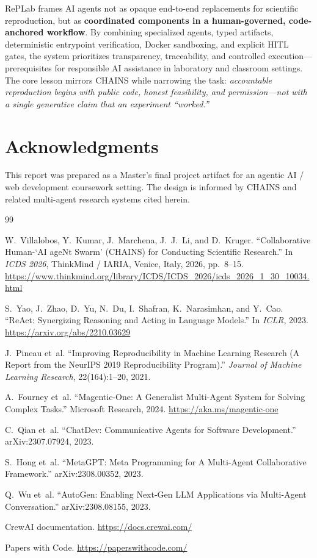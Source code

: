 \documentclass[11pt,a4paper]{article}
\begin{document}
RePLab frames AI agents not as opaque end-to-end replacements for scientific
reproduction, but as \textbf{coordinated components in a human-governed,
code-anchored workflow}. By combining specialized agents, typed artifacts,
deterministic entrypoint verification, Docker sandboxing, and explicit HITL
gates, the system prioritizes transparency, traceability, and controlled
execution---prerequisites for responsible AI assistance in laboratory and
classroom settings. The core lesson mirrors CHAINS while narrowing the task:
\emph{accountable reproduction begins with public code, honest feasibility, and
permission---not with a single generative claim that an experiment ``worked.''}

\section*{Acknowledgments}
This report was prepared as a Master's final project artifact for an agentic AI /
web development coursework setting. The design is informed by CHAINS and related
multi-agent research systems cited herein.

\begin{thebibliography}{99}

W.~Villalobos, Y.~Kumar, J.~Marchena, J.~J.~Li, and D.~Kruger.
``Collaborative Human-`AI ageNt Swarm' (CHAINS) for Conducting Scientific Research.''
In \emph{ICDS 2026}, ThinkMind / IARIA, Venice, Italy, 2026, pp.~8--15.
\url{https://www.thinkmind.org/library/ICDS/ICDS_2026/icds_2026_1_30_10034.html}

S.~Yao, J.~Zhao, D.~Yu, N.~Du, I.~Shafran, K.~Narasimhan, and Y.~Cao.
``ReAct: Synergizing Reasoning and Acting in Language Models.''
In \emph{ICLR}, 2023.
\url{https://arxiv.org/abs/2210.03629}

J.~Pineau et~al.
``Improving Reproducibility in Machine Learning Research (A Report from the NeurIPS 2019 Reproducibility Program).''
\emph{Journal of Machine Learning Research}, 22(164):1--20, 2021.

A.~Fourney et~al.
``Magentic-One: A Generalist Multi-Agent System for Solving Complex Tasks.''
Microsoft Research, 2024.
\url{https://aka.ms/magentic-one}

C.~Qian et~al.
``ChatDev: Communicative Agents for Software Development.''
arXiv:2307.07924, 2023.

S.~Hong et~al.
``MetaGPT: Meta Programming for A Multi-Agent Collaborative Framework.''
arXiv:2308.00352, 2023.

Q.~Wu et~al.
``AutoGen: Enabling Next-Gen LLM Applications via Multi-Agent Conversation.''
arXiv:2308.08155, 2023.

CrewAI documentation.
\url{https://docs.crewai.com/}

Papers with Code.
\url{https://paperswithcode.com/}

\end{thebibliography}
\end{document}
